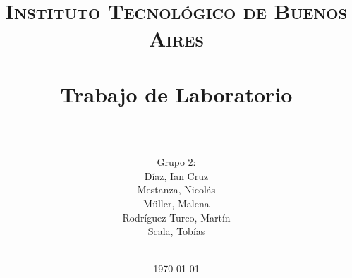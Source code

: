 




\title{
	\normalfont \normalsize \textsc{Instituto Tecnológico de Buenos Aires} \\ [25pt]
	\horrule{2pt} \\[0.4cm]
	\huge Trabajo de Laboratorio \\
	\horrule{2pt} \\[0cm]
\author{Grupo 2:\\Díaz, Ian Cruz\\Mestanza, Nicol\'as\\ Müller, Malena\\Rodr\'iguez Turco, Mart\'in\\ Scala, Tob\'ias\\ \\ }
}
\date{\today} %

\maketitle
\newpage




%
%


